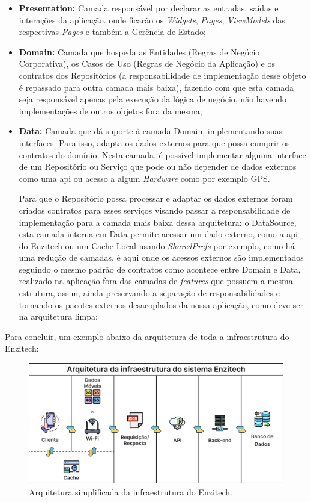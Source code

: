 \begin{itemize}
   \item \textbf{Presentation:} Camada responsável por declarar as entradas, saídas e interações da aplicação. onde ficarão os \textit{Widgets}, \textit{Pages}, \textit{ViewModels} das respectivas \textit{Pages} e também a Gerência de Estado;
   \item \textbf{Domain:} Camada que hospeda as Entidades (Regras de Negócio Corporativa), os Casos de Uso (Regras de Negócio da Aplicação) e os contratos dos Repositórios (a responsabilidade de implementação desse objeto é repassado para outra camada mais baixa), fazendo com que esta camada seja responsável apenas pela execução da lógica de negócio, não havendo implementações de outros objetos fora da mesma;
   \item \textbf{Data:} Camada que dá suporte à camada Domain, implementando suas interfaces. Para isso, adapta os dados externos para que possa cumprir os contratos do domínio. Nesta camada, é possível implementar alguma interface de um Repositório ou Serviço que pode ou não depender de dados externos como uma \ac{api} ou acesso a algum \textit{Hardware} como por exemplo GPS. 
   
   Para que o Repositório possa processar e adaptar os dados externos foram criados contratos para esses serviços visando passar a responsabilidade de implementação para a camada mais baixa dessa arquitetura: o DataSource, esta camada interna em Data permite acessar um dado externo, como a \ac{api} do Enzitech ou um Cache Local usando \textit{SharedPrefs} por exemplo, como há uma redução de camadas, é aqui onde os acessos externos são implementados seguindo o mesmo padrão de contratos como acontece entre Domain e Data, realizado na aplicação fora das camadas de \textit{features} que possuem a mesma estrutura, assim, ainda preservando a separação de responsabilidades e tornando os pacotes externos desacoplados da nossa aplicação, como deve ser na arquitetura limpa;
 \end{itemize}

Para concluir, um exemplo abaixo da arquitetura de toda a infraestrutura do Enzitech:

\begin{figure}[H]
\centering
  \includegraphics[width=\columnwidth]{images/arquitetura_enzitech.pdf}
  \caption{Arquitetura simplificada da infraestrutura do Enzitech.}
  \label{fig:arquitetura_enzitech}
\end{figure}

